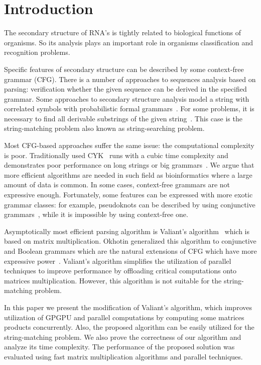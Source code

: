 \section{Introduction}

The secondary structure of RNA's is tightly related to biological functions of organisms.
So its analysis plays an important role in organisms classification and recognition problems.

Specific features of secondary structure can be described by some context-free grammar (CFG).
There is a number of approaches to sequences analysis based on parsing: verification whether the given sequence can be derived in the specified grammar.
Some approaches to secondary structure analysis model a string with correlated symbols with probabilistic formal grammars~\cite{knudsen1999rna,dowell2004evaluation}.
For some problems, it is necessary to find all derivable substrings of the given string~\cite{durbin1996biological}.
This case is the string-matching problem also known as string-searching problem.

Most CFG-based approaches suffer the same issue: the computational complexity is poor.
Traditionally used CYK~\cite{kasami1966efficient,Younger:1966:CLP:1441427.1442019} runs with a cubic time complexity and demonstrates poor performance on long strings or big grammars~\cite{liu2005parallel}.
We argue that more efficient algorithms are needed in such field as bioinformatics where a large amount of data is common.
In some cases, context-free grammars are not expressive enough.
Fortunately, some features can be expressed with more exotic grammar classes:  for example, pseudoknots can be described by using conjunctive grammars~\cite{zier2013rna}, while it is impossible by using context-free one.

Asymptotically most efficient parsing algorithm is Valiant's algorithm~\cite{Valiant:1975:GCR:1739932.1740048} which is based on matrix multiplication.
Okhotin generalized this algorithm to conjunctive and Boolean grammars which are the natural extensions of CFG which have more expressive power~\cite{Okhotin:2014:PMM:2565359.2565379}.
Valiant’s algorithm simplifies the utilization of parallel techniques to improve performance by offloading critical computations onto matrices multiplication.
However, this algorithm is not suitable for the string-matching problem.

In this paper we present the modification of Valiant's algorithm, which improves utilization of GPGPU and parallel computations by computing some matrices products concurrently.
Also, the proposed algorithm can be easily utilized for the string-matching problem.
We also prove the correctness of our algorithm and analyze its time complexity.
The performance of the proposed solution was evaluated using fast matrix multiplication algorithms and parallel techniques.
